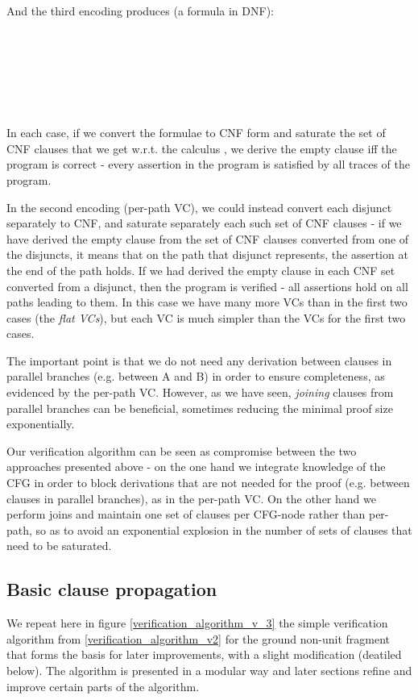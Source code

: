 \bigskip

And the third encoding produces (a formula in DNF):\\
\\
\\
\\
\\
\\
\\

In each case, if we convert the formulae to CNF form and saturate the set of CNF clauses that we get w.r.t. the calculus \SPG, we derive the empty clause iff the program is correct - every assertion in the program is satisfied by all traces of the program.

In the second encoding (per-path VC), we could instead convert each disjunct separately to CNF, 
and saturate separately each such set of CNF clauses - if we have derived the empty clause from the set of CNF clauses converted from one of the disjuncts, it means that on the path that disjunct represents, the assertion at the end of the path holds. 
If we had derived the empty clause in each CNF set converted from a disjunct, then the program is verified - all assertions hold on all paths leading to them. 
In this case we have many more VCs than in the first two cases (the \emph{flat VCs}), but each VC is much simpler than the VCs for the first two cases.

The important point is that we do not need any derivation between clauses in parallel branches (e.g. between A and B) in order to ensure completeness, as evidenced by the per-path VC.
However, as we have seen, \emph{joining} clauses from parallel branches can be beneficial, sometimes reducing the minimal proof size exponentially.

Our verification algorithm can be seen as compromise between the two approaches presented above - on the one hand we integrate knowledge of the CFG in order to block derivations that are not needed for the proof (e.g. between clauses in parallel branches), as in the per-path VC.
On the other hand we perform joins and maintain one set of clauses per CFG-node rather than per-path, so as to avoid an exponential explosion in the number of sets of clauses that need to be saturated.

\subsection{Basic clause propagation}\label{section_basic_clause_propagation}
We repeat here in figure \ref{verification_algorithm_v_3} the simple verification algorithm from \ref{verification_algorithm_v2} for the ground non-unit fragment that forms the basis for later improvements, with a slight modification (deatiled below).
The algorithm is presented in a modular way and later sections refine and improve certain parts of the algorithm.


